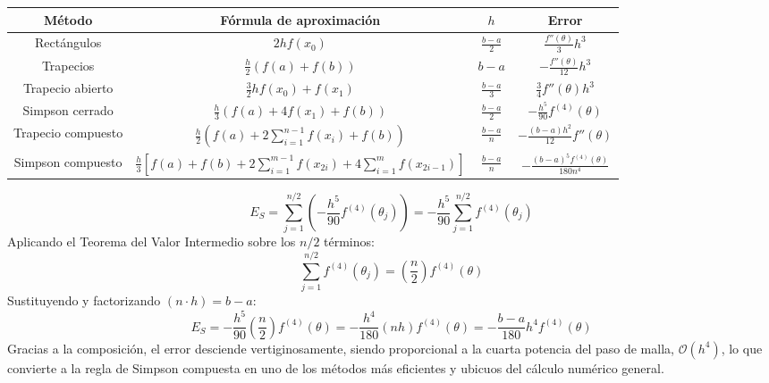 \begin{center}
    \begin{tabular}{|c|c|c|c|}
        \hline
        Método & Fórmula de aproximación & $h$ & Error \\
        \hline
        Rectángulos & $2hf(x_0)$ & $\frac{b-a}{2}$ & $\frac{f''(\theta)}{3} h^3$ \\
        \hline
        Trapecios & $\frac{h}{2} (f(a) + f(b))$ & $b-a$ & $-\frac{f''(\theta)}{12} h^3$ \\
        \hline
        Trapecio abierto & $\frac{3}{2}h f(x_0) + f(x_1)$ & $\frac{b-a}{3}$ & $\frac{3}{4} f''(\theta) h^3$ \\
        \hline
        Simpson cerrado & $\frac{h}{3} (f(a) + 4f(x_1) + f(b))$ & $\frac{b-a}{2}$ & $-\frac{h^5}{90} f^{(4)}(\theta)$ \\
        \hline
        Trapecio compuesto & $\frac{h}{2} (f(a) + 2 \sum_{i=1}^{n-1} f(x_i) + f(b))$ & $\frac{b-a}{n}$ & $-\frac{(b-a)h^2}{12}f''(\theta)$ \\
        \hline
        Simpson compuesto & $\frac{h}{3} \left[
            f(a) + f(b)
            + 2\sum_{i=1}^{m-1} f(x_{2i})
            + 4\sum_{i=1}^{m} f(x_{2i-1})
        \right]$ & $\frac{b-a}{n}$ & $-\frac{(b-a)^5 f^{(4)}(\theta)}{180 n^4}$ \\
        \hline
    \end{tabular}
\end{center}
\[
    E_S = \sum_{j=1}^{n/2} \left( -\frac{h^5}{90} f^{(4)}(\theta_j) \right) = -\frac{h^5}{90} \sum_{j=1}^{n/2} f^{(4)}(\theta_j)
\]
Aplicando el Teorema del Valor Intermedio sobre los $n/2$ términos:
\[
    \sum_{j=1}^{n/2} f^{(4)}(\theta_j) = \left(\frac{n}{2}\right) f^{(4)}(\theta)
\]
Sustituyendo y factorizando $(n \cdot h) = b-a$:
\[
    E_S = -\frac{h^5}{90} \left( \frac{n}{2} \right) f^{(4)}(\theta) = -\frac{h^4}{180} (nh) f^{(4)}(\theta) = \boxed{-\frac{b-a}{180} h^4 f^{(4)}(\theta)}
\]
Gracias a la composición, el error desciende vertiginosamente, siendo proporcional a la cuarta potencia del paso de malla, $\mathcal{O}(h^4)$, lo que convierte a la regla de Simpson compuesta en uno de los métodos más eficientes y ubicuos del cálculo numérico general.